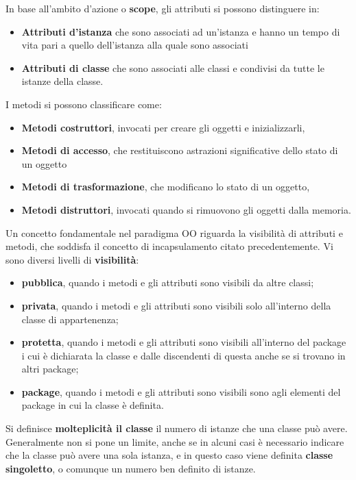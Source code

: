 \documentclass[a4paper,18pt]{extarticle}
\begin{document}
In base all'ambito d'azione o \textbf{scope}, gli attributi si possono distinguere in:
\begin{itemize}
  \item \textbf{Attributi d'istanza} che sono associati ad un'istanza e hanno un tempo di vita pari a quello dell'istanza alla quale sono associati
  \item \textbf{Attributi di classe} che sono associati alle classi e condivisi da tutte le istanze della classe.
\end{itemize}

I metodi si possono classificare come:
\begin{itemize}
  \item \textbf{Metodi costruttori}, invocati per creare gli oggetti e inizializzarli,
  \item \textbf{Metodi di accesso}, che restituiscono astrazioni significative dello stato di un oggetto
  \item \textbf{Metodi di trasformazione}, che modificano lo stato di un oggetto,
  \item \textbf{Metodi distruttori}, invocati quando si rimuovono gli oggetti dalla memoria.
\end{itemize}

Un concetto fondamentale nel paradigma OO riguarda la visibilità di attributi e metodi, che soddisfa il concetto di incapsulamento citato precedentemente. Vi sono diversi livelli di \textbf{visibilità}:

\begin{itemize}
    \item \textbf{pubblica}, quando i metodi e gli attributi sono visibili da altre classi;
    \item \textbf{privata}, quando i metodi e gli attributi sono visibili solo all'interno della classe di appartenenza;
    \item \textbf{protetta}, quando i metodi e gli attributi sono visibili all'interno del package i cui è dichiarata la classe e dalle discendenti di questa anche se si trovano in altri package;
    \item \textbf{package}, quando i metodi e gli attributi sono visibili sono agli elementi del package in cui la classe è definita.
\end{itemize}

Si definisce \textbf{molteplicità il classe} il numero di istanze che una classe può avere. Generalmente non si pone un limite, anche se in alcuni casi è necessario indicare che la classe può avere una sola istanza, e in questo caso viene definita \textbf{classe singoletto}, o comunque un numero ben definito di istanze.
\end{document}
